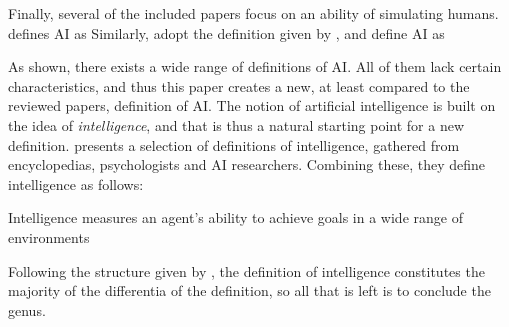 Finally, several of the included papers focus on an ability of simulating humans. \textcite[p. 3-4]{Liu_2021} defines AI as  Similarly, \textcite[p. 3]{vanBruxvoort_2021} adopt the definition given by \textcite{Shubhendu_2013}, and define AI as 

As shown, there exists a wide range of definitions of AI. All of them lack certain characteristics, and thus this paper creates a new, at least compared to the reviewed papers, definition of AI. The notion of artificial intelligence is built on the idea of \textit{intelligence}, and that is thus a natural starting point for a new definition. \textcite{Legg_2007} presents a selection of definitions of intelligence, gathered from encyclopedias, psychologists and AI researchers. Combining these, they define intelligence as follows:
\begin{displayquote}
    Intelligence measures an agent’s ability to achieve goals in a wide range of environments
\end{displayquote}
Following the structure given by \textcite{Seppälä_2014}, the definition of intelligence constitutes the majority of the differentia of the definition, so all that is left is to conclude the genus.

